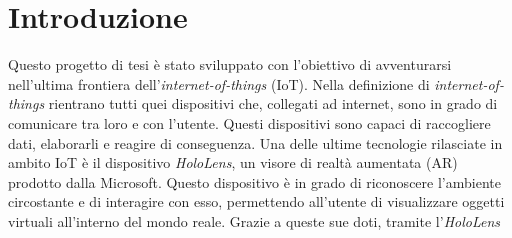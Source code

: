 \chapter{Introduzione}

Questo progetto di tesi è stato sviluppato con l'obiettivo di avventurarsi nell'ultima frontiera dell'\textit{internet-of-things} (IoT). Nella definizione di \textit{internet-of-things} 
rientrano tutti quei dispositivi che, collegati ad internet, sono in grado di comunicare tra loro e con l'utente. Questi dispositivi sono capaci di raccogliere dati, elaborarli e
reagire di conseguenza. Una delle ultime tecnologie rilasciate in ambito IoT è il dispositivo \textit{HoloLens}, un visore di realtà aumentata (AR) prodotto dalla Microsoft. Questo dispositivo
è in grado di riconoscere l'ambiente circostante e di interagire con esso, permettendo all'utente di visualizzare oggetti virtuali all'interno del mondo reale. Grazie a queste sue doti, 
tramite l'\textit{HoloLens} 